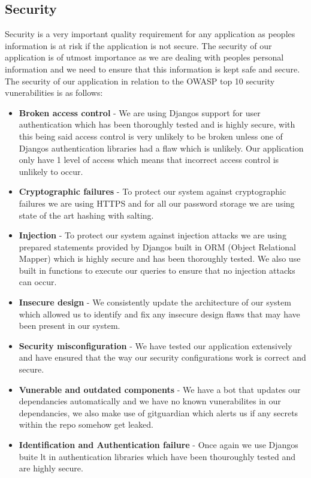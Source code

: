 \documentclass[12pt]{article}
\begin{document}
\subsection{Security}
Security is a very important quality requirement for any application as peoples information is at risk if the application is not secure. The security of our application is of utmost importance as we are dealing with peoples personal information and we need to ensure that this information is kept safe and secure. The security of our application in relation to the OWASP top 10 security vunerabilities is as follows:
\begin{itemize}
    \item \textbf{Broken access control} - We are using Djangos support for user authentication which has been thoroughly tested and is highly secure, with this being said access control is very unlikely to be broken unless one of Djangos authentication libraries had a flaw which is unlikely. Our application only have 1 level of access which means that incorrect access control is unlikely to occur.
    \item \textbf{Cryptographic failures} - To protect our system against cryptographic failures we are using HTTPS and for all our password storage we are using state of the art hashing with salting.
    \item \textbf{Injection} - To protect our system against injection attacks we are using prepared statements provided by Djangos built in ORM (Object Relational Mapper) which is highly secure and has been thoroughly tested. We also use built in functions to execute our queries to ensure that no injection attacks can occur.
    \item \textbf{Insecure design} - We consistently update the architecture of our system which allowed us to identify and fix any insecure design flaws that may have been present in our system.
    \item \textbf{Security misconfiguration} - We have tested our application extensively and have ensured that the way our security configurations work is correct and secure.
    \item \textbf{Vunerable and outdated components} - We have a bot that updates our dependancies automatically and we have no known vunerabilites in our dependancies, we also make use of gitguardian which alerts us if any secrets within the repo somehow get leaked.
    \item \textbf{Identification and Authentication failure} - Once again we use Djangos buite lt in authentication libraries which have been thouroughly tested and are highly secure.

\end{itemize}
\end{document}
